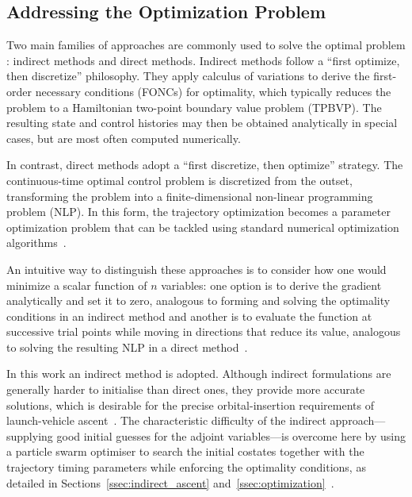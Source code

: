 
\subsection{Addressing the Optimization Problem}

Two main families of approaches are commonly used to solve the optimal problem \cite{Optimization_Review}: indirect methods and direct methods. Indirect methods follow a ``first optimize, then discretize'' philosophy. They apply calculus of variations to derive the first-order necessary conditions (FONCs) for optimality, which typically reduces the problem to a Hamiltonian two-point boundary value problem (TPBVP). The resulting state and control histories may then be obtained analytically in special cases, but are most often computed numerically.

In contrast, direct methods adopt a ``first discretize, then optimize'' strategy. The continuous-time optimal control problem is discretized from the outset, transforming the problem into a finite-dimensional non-linear programming problem (NLP). In this form, the trajectory optimization becomes a parameter optimization problem that can be tackled using standard numerical optimization algorithms~\cite{Optimization_Review}.

An intuitive way to distinguish these approaches is to consider how one would minimize a scalar function of $n$ variables: one option is to derive the gradient analytically and set it to zero, analogous to forming and solving the optimality conditions in an indirect method and another is to evaluate the function at successive trial points while moving in directions that reduce its value, analogous to solving the resulting NLP in a direct method~\cite{Optimization_Review}.

In this work an indirect method is adopted. Although indirect formulations are generally harder to initialise than direct ones, they provide more accurate solutions, which is desirable for the precise orbital-insertion requirements of launch-vehicle ascent~\cite{conway2010spacecraft}. The characteristic difficulty of the indirect approach---supplying good initial guesses for the adjoint variables---is overcome here by using a particle swarm optimiser to search the initial costates together with the trajectory timing parameters while enforcing the optimality conditions, as detailed in Sections~\ref{ssec:indirect_ascent} and~\ref{ssec:optimization}~\cite{pontani2014particle}.


